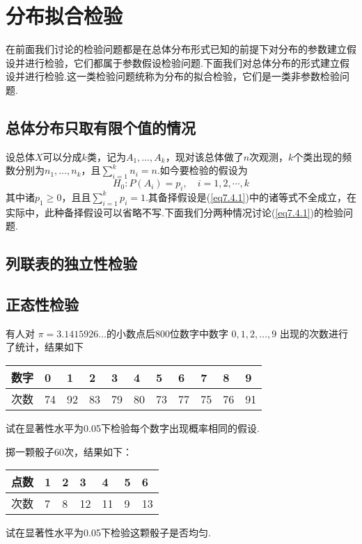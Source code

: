 \section{分布拟合检验}\label{sec:7.4}
在前面我们讨论的检验问题都是在总体分布形式已知的前提下对分布的参数建立假设并进行检验，它们都属于参数假设检验问题.下面我们对总体分布的形式建立假设并进行检验.这一类检验问题统称为分布的拟合检验，它们是一类非参数检验问题.

\subsection{总体分布只取有限个值的情况}\label{sec:7.3.1}
设总体$X$可以分成$k$类，记为$A_{1},\dotsc,A_{k}$，现对该总体做了$n$次观测，$k$个类出现的频数分别为$n_{1},\dotsc,n_{k}$，且$\sum _ { i = 1 } ^ { k } n _ { i } = n$.如今要检验的假设为
\begin{equation}\label{eq7.4.1}
H _ { 0 } : P \left( A _ { i } \right) = p _ { i } , \quad i = 1,2 , \cdots , k
\end{equation}
其中诸$p_{1}\geq 0$，且且$\sum _ { i = 1 } ^ { k } p _ { i } = 1$.其备择假设是(\ref{eq7.4.1})中的诸等式不全成立，在实际中，此种备择假设可以省略不写.下面我们分两种情况讨论(\ref{eq7.4.1})的检验问题.
\subsection{列联表的独立性检验}\label{sec:7.3.2}
\subsection{正态性检验}\label{sec:7.3.3}

\begin{xiti}
	\item 有人对 $\pi =3.1415926\dotsc $的小数点后800位数字中数字 $0,1,2,\dotsc,9$ 出现的次数进行了统计，结果如下
	
	\begin{table}[!htp]
		\centering
\begin{tabularx}{1.0\textwidth}{Z|ZZZZZZZZZZ}
	数字&0&1&2&3&4&5&6&7&8&9\\
			\midrule
	次数&74&92&83&79&80&73&77&75&76&91
		\end{tabularx}
	\end{table}

试在显著性水平为0.05下检验每个数字出现概率相同的假设.

\item 掷一颗骰子60次，结果如下：
\begin{table}[!htp]
	\centering
	\begin{tabularx}{1.0\textwidth}{Z|ZZZZZZ}
		点数&1&2&3&4&5&6\\
		\midrule
		次数&7&8&12&11&9&13
	\end{tabularx}
\end{table}

试在显著性水平为0.05下检验这颗骰子是否均匀.
\end{xiti}
